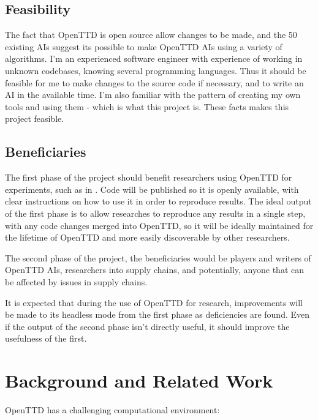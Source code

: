 \documentclass[a4paper,11pt]{article}
\begin{document}
\subsection{Feasibility}

The fact that OpenTTD is open source allow changes to be made, and the 50 existing AIs suggest its possible to make OpenTTD AIs using a variety of algorithms. I'm an experienced software engineer with experience of working in unknown codebases, knowing several programming languages. Thus it should be feasible for me to make changes to the source code if necessary, and to write an AI in the available time. I'm also familiar with the pattern of creating my own tools and using them - which is what this project is. These facts makes this project feasible.

\subsection{Beneficiaries}

The first phase of the project should benefit researchers using OpenTTD for experiments, such as in \cite{rios_trains_2009, wisniewski_artificial, shen_rtsenv_2011}. Code will be published so it is openly available, with clear instructions on how to use it in order to reproduce results. The ideal output of the first phase is to allow researches to reproduce any results in a single step, with any code changes merged into OpenTTD, so it will be ideally maintained for the lifetime of OpenTTD and more easily discoverable by other researchers.

The second phase of the project, the beneficiaries would be players and writers of OpenTTD AIs, researchers into supply chains, and potentially, anyone that can be affected by issues in supply chains.

It is expected that during the use of OpenTTD for research, improvements will be made to its headless mode from the first phase as deficiencies are found. Even if the output of the second phase isn't directly useful, it should improve the usefulness of the first.

\section{Background and Related Work}

OpenTTD has a challenging computational environment:
\end{document}
